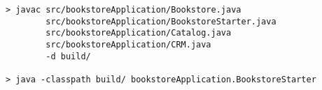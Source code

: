 \begin{lstlisting}[caption=Commands to compile and run the Bookstore application]
> javac src/bookstoreApplication/Bookstore.java 
        src/bookstoreApplication/BookstoreStarter.java 
        src/bookstoreApplication/Catalog.java 
        src/bookstoreApplication/CRM.java 
        -d build/

> java -classpath build/ bookstoreApplication.BookstoreStarter 
\end{lstlisting}
